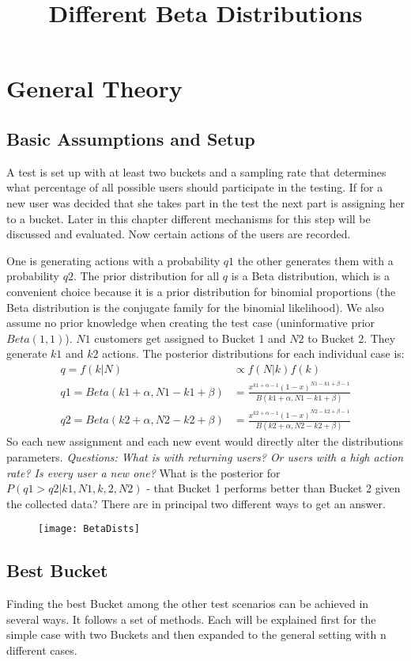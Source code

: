 \documentclass[../Thesis.tex]{subfiles}
\begin{document}
\chapter{General Theory}
\section{Basic Assumptions and Setup}
A test is set up with at least two buckets and a sampling rate that determines what percentage of all possible users should participate in the testing. If for a new user was decided that she takes part in the test the next part is assigning her to a bucket. Later in this chapter different mechanisms for this step will be discussed and evaluated. Now certain actions of the users are recorded.

 One is generating actions with a probability $q1$ the other generates them with a probability $q2$. The prior distribution for all $q$ is a Beta distribution, which is a convenient choice because it is a prior distribution for binomial proportions (the Beta distribution is the conjugate family for the binomial likelihood). We also assume no prior knowledge when creating the test case (uninformative prior $Beta(1,1)$). $N1$ customers get assigned to Bucket 1 and $N2$ to Bucket 2. They generate $k1$ and $k2$ actions. The posterior distributions for each individual case is:
\begin{align*}
q = f(k|N) &\propto f(N|k)f(k)\\
q1 = Beta(k1+\alpha,N1-k1+\beta) & = \frac{x^{k1+\alpha-1}(1-x)^{N1-k1+\beta -1}}{B(k1+\alpha,N1-k1+\beta)} \\
q2 = Beta(k2+\alpha,N2-k2+\beta) & = \frac{x^{k2+\alpha-1}(1-x)^{N2-k2+\beta -1}}{B(k2+\alpha,N2-k2+\beta)}
\end{align*}
So each new assignment and each new event would directly alter the distributions parameters.\textit{ Questions: What is with returning users? Or users with a high action rate? Is every user a new one?}
What is the posterior for $P(q1>q2 | k1,N1,k,2,N2)$ - that Bucket 1 performs better than Bucket 2 given the collected data? There are in principal two different ways to get an answer.
\begin{figure}[h]
\texttt{[image: BetaDists]}
\centering
\title{Different Beta Distributions}
\end{figure}

\section{Best Bucket}
Finding the best Bucket among the other test scenarios can be achieved in several ways. It follows a set of methods. Each will be explained first for the simple case with two Buckets and then expanded to the general setting with n different cases.
\end{document}
